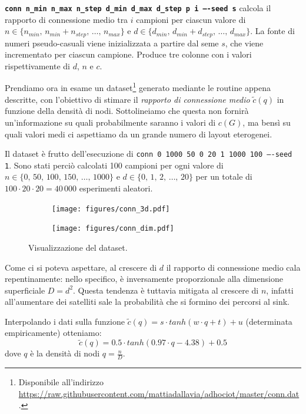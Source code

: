 \documentclass[a4paper,12pt]{article}
\theoremstyle{definition}
\begin{document}
\texttt{\textbf{conn n\_min n\_max n\_step d\_min d\_max d\_step p i ----seed s}} calcola il rapporto di connessione medio tra $i$ campioni per ciascun valore di $n \in \{n_{min},\,n_{min}+n_{step},\,\dots,\,n_{max}\}$ e $d \in \{d_{min},\,d_{min}+d_{step},\,\dots,\,d_{max}\}$. La fonte di numeri pseudo-casuali viene inizializzata a partire dal seme $s$, che viene incrementato per ciascun campione. Produce tre colonne con i valori rispettivamente di $d$, $n$ e $c$.


Prendiamo ora in esame un dataset\footnote{Disponibile all'indirizzo \url{https://raw.githubusercontent.com/mattiadallavia/adhociot/master/conn.dat}.} generato mediante le routine appena descritte, con l'obiettivo di stimare il \emph{rapporto di connessione medio} $\tilde{c}(q)$ in funzione della densità di nodi. Sottolineiamo che questa non fornirà un'informazione su quali probabilmente saranno i valori di $c(G)$, ma bensì su quali valori medi ci aspettiamo da un grande numero di layout eterogenei.

Il dataset è frutto dell'esecuzione di \texttt{conn 0 1000 50 0 20 1 1000 100 ----seed 1}. Sono stati perciò calcolati 100 campioni per ogni valore di $n \in \{0,\,50,\,100,\,150,\,\dots,\,1000\}$ e $d \in \{0,\,1,\,2,\,\dots,\,20\}$ per un totale di $100 \cdot 20 \cdot 20 = 40\,000$ esperimenti aleatori.

\begin{figure}[H]
\begin{subfigure}[b]{0.5\textwidth}
\texttt{[image: figures/conn\_3d.pdf]}
\end{subfigure}
\begin{subfigure}[b]{0.5\textwidth}
\texttt{[image: figures/conn\_dim.pdf]}
\end{subfigure}
\caption{Visualizzazione del dataset.}
\end{figure}

Come ci si poteva aspettare, al crescere di $d$ il rapporto di connessione medio cala repentinamente: nello specifico, è inversamente proporzionale alla dimensione superficiale $D = d^2$. Questa tendenza è tuttavia mitigata al crescere di $n$, infatti all'aumentare dei satelliti sale la probabilità che si formino dei percorsi al sink.

Interpolando i dati sulla funzione $\tilde{c}(q) = s \cdot tanh(w \cdot q + t) + u$ (determinata empiricamente) otteniamo:
\begin{equation*}
\tilde{c}(q) = 0.5 \cdot tanh(0.97 \cdot q - 4.38) + 0.5
\end{equation*}
dove $q$ è la densità di nodi $q = \frac{n}{D}$.
\end{document}
